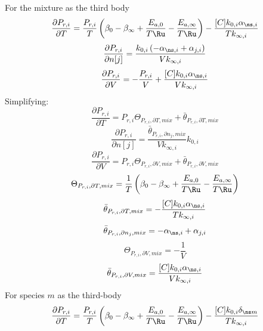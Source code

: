 \documentclass[a4paper,10pt]{article}
\begin{document}
For the mixture as the third body
\begin{dmath} \frac{\partial P_{r, i} }{\partial T } = \frac{P_{r, i}}{T} \left(\beta_{0} - \beta_{\infty} + \frac{E_{a, 0}}{T \Ru} - \frac{E_{a, \infty}}{T \Ru}\right) - \frac{[C] k_{0, i} \alpha_{\ns,i}}{T k_{\infty, i}}\end{dmath} 
\begin{dmath} \frac{\partial P_{r, i} }{\partial n[j] } = \frac{k_{0, i} \left(- \alpha_{\ns,i} + \alpha_{j,i}\right)}{V k_{\infty, i}}\end{dmath} 
\begin{dmath} \frac{\partial P_{r, i} }{\partial V } = - \frac{P_{r, i}}{V} + \frac{[C] k_{0, i} \alpha_{\ns,i}}{V k_{\infty, i}}\end{dmath} 
Simplifying:
\begin{dmath} \frac{\partial P_{r, i} }{\partial T } = P_{r, i} \Theta_{P_{r,i}, \partial T, mix} + \bar{\theta}_{P_{r, i}, \partial T, mix}\end{dmath} 
\begin{dmath} \frac{\partial P_{r, i} }{\partial n[j] } = \frac{\bar{\theta}_{P_{r, i}, \partial n_j, mix}}{V k_{\infty, i}} k_{0, i}\end{dmath} 
\begin{dmath} \frac{\partial P_{r, i} }{\partial V } = P_{r, i} \Theta_{P_{r,i}, \partial V, mix} + \bar{\theta}_{P_{r, i}, \partial V, mix}\end{dmath} 
\begin{dmath} \Theta_{P_{r,i}, \partial T, mix} = \frac{1}{T} \left(\beta_{0} - \beta_{\infty} + \frac{E_{a, 0}}{T \Ru} - \frac{E_{a, \infty}}{T \Ru}\right)\end{dmath} 
\begin{dmath} \bar{\theta}_{P_{r, i}, \partial T, mix} = - \frac{[C] k_{0, i} \alpha_{\ns,i}}{T k_{\infty, i}}\end{dmath} 
\begin{dmath} \bar{\theta}_{P_{r, i}, \partial n_j, mix} = - \alpha_{\ns,i} + \alpha_{j,i}\end{dmath} 
\begin{dmath} \Theta_{P_{r,i}, \partial V, mix} = - \frac{1}{V}\end{dmath} 
\begin{dmath} \bar{\theta}_{P_{r, i}, \partial V, mix} = \frac{[C] k_{0, i} \alpha_{\ns,i}}{V k_{\infty, i}}\end{dmath} 
For species $m$ as the third-body
\begin{dmath} \frac{\partial P_{r, i} }{\partial T } = \frac{P_{r, i}}{T} \left(\beta_{0} - \beta_{\infty} + \frac{E_{a, 0}}{T \Ru} - \frac{E_{a, \infty}}{T \Ru}\right) - \frac{[C] k_{0, i} \delta_{\ns m}}{T k_{\infty, i}}\end{dmath} 
\end{document}
